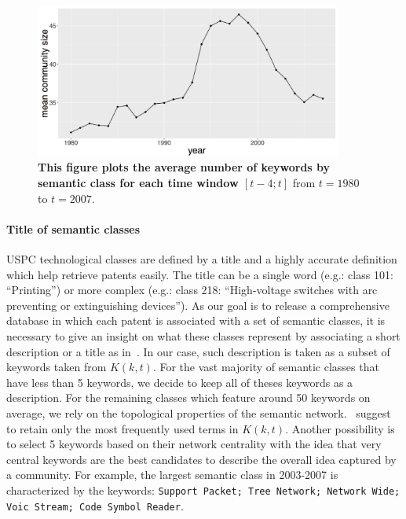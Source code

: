 \documentclass[12pt,twoside,a4paper]{article}
\begin{document}
\begin{figure}
\centering
\includegraphics[width=0.9\textwidth]{meancomsize.jpg}
\caption{\textbf{This figure plots the average number of keywords by semantic class for each time window $\left[t-4; t\right]$} from $t=1980$ to $t=2007$.}
\label{fig:mean_K}
\end{figure}



\paragraph*{Title of semantic classes}
USPC technological classes are defined by a title and a highly accurate definition which help retrieve patents easily. The title can be a single word (e.g.: class 101: ``Printing'') or more complex (e.g.: class 218: ``High-voltage switches with arc preventing or extinguishing devices''). As our goal is to release a comprehensive database in which each patent is associated with a set of semantic classes, it is necessary to give an insight on what these classes represent by associating a short description or a title as in~\cite{tseng2007text}. In our case, such description is taken as a subset of keywords taken from $K(k,t)$. For the vast majority of semantic classes that have less than 5 keywords, we decide to keep all of theses keywords as a description. For the remaining classes which feature around 50 keywords on average, we rely on the topological properties of the semantic network.~\cite{yang2000improving} suggest to retain only the most frequently used terms in $K(k,t)$. Another possibility is to select 5 keywords based on their network centrality with the idea that very central keywords are the best candidates to describe the overall idea captured by a community. For example, the largest semantic class in 2003-2007 is characterized by the keywords: \texttt{Support Packet; Tree Network; Network Wide; Voic Stream; Code Symbol Reader}.
\end{document}
